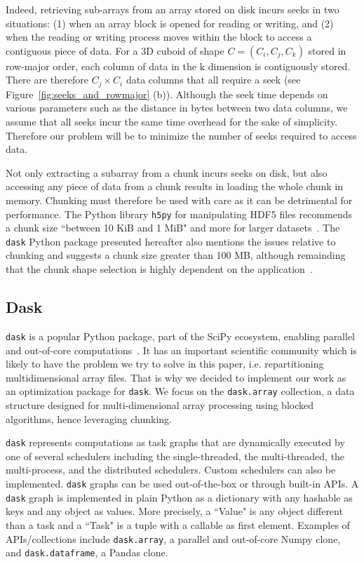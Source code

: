 \documentclass[conference]{IEEEtran}
\begin{document}
Indeed, retrieving sub-arrays from an array stored on disk incurs seeks in two
situations: (1) when an array block is opened for reading or writing, and (2)
when the reading or writing process moves within the block to access a
contiguous piece of data. For a 3D cuboid of shape $C = (C_i, C_j, C_k)$ stored
in row-major order, each column of data in the k dimension is contiguously
stored. There are therefore $C_j \times C_i$ data columns that all require a
seek (see Figure~\ref{fig:seeks_and_rowmajor} (b)).
Although the seek time depends on various parameters such as the distance
in bytes between two data columns, we assume that all seeks incur the same time
overhead for the sake of simplicity. Therefore our problem will be to minimize
the number of seeks required to access data.

Not only extracting a subarray from a chunk incurs seeks on disk, but also
accessing any piece of data from a chunk results in loading the whole chunk in
memory. Chunking must therefore be used with care as it can be detrimental for
performance. The Python library \texttt{h5py} for manipulating HDF5 files
recommends a chunk size ``between 10 KiB and 1 MiB" and more for larger
datasets~\cite{collette_2014}. The \texttt{dask} Python package presented
hereafter also mentions the issues relative to chunking and suggests a chunk
size greater than 100 MB, although remainding that the chunk shape selection is
highly dependent on the application~\cite{rocklin_bourbeau_2019}.

\subsection{Dask}
\texttt{dask} is a popular Python package, part of the SciPy ecosystem, enabling parallel
and out-of-core computations~\cite{matthew_rocklin-proc-scipy-2015}. It has an
important scientific community which is likely to have the problem we try to
solve in this paper, i.e. repartitioning multidimensional array files. That is why
we decided to implement our work as an optimization package for \texttt{dask}.
We focus on the \texttt{dask.array} collection, a data structure designed for
multi-dimensional array processing using blocked algorithms, hence leveraging
chunking.

\texttt{dask} represents computations as task graphs that are dynamically executed by one
of several schedulers including the single-threaded, the multi-threaded, the
multi-process, and the distributed schedulers. Custom schedulers can also be
implemented. \texttt{dask} graphs can be used out-of-the-box or through
built-in APIs. A \texttt{dask} graph is implemented in plain Python as a
dictionary with any hashable as keys and any object as values. More precisely,
a ``Value" is any object different than a task and a ``Task" is a tuple with a
callable as first element. Examples of APIs/collections include
\texttt{dask.array}, a parallel and out-of-core
Numpy clone, and \texttt{dask.dataframe}, a Pandas clone.
\end{document}
